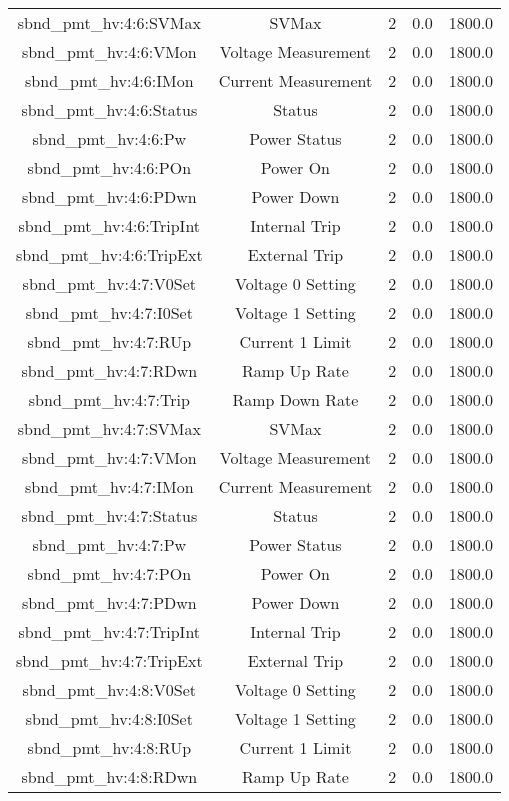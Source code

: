 \begin{table}[ptb]
\begin{tabular}{c | c c c c}
sbnd_pmt_hv:4:6:SVMax & SVMax & 2 & 0.0 & 1800.0\\ 
sbnd_pmt_hv:4:6:VMon & Voltage Measurement & 2 & 0.0 & 1800.0\\ 
sbnd_pmt_hv:4:6:IMon & Current Measurement & 2 & 0.0 & 1800.0\\ 
sbnd_pmt_hv:4:6:Status & Status & 2 & 0.0 & 1800.0\\ 
sbnd_pmt_hv:4:6:Pw & Power Status & 2 & 0.0 & 1800.0\\ 
sbnd_pmt_hv:4:6:POn & Power On & 2 & 0.0 & 1800.0\\ 
sbnd_pmt_hv:4:6:PDwn & Power Down & 2 & 0.0 & 1800.0\\ 
sbnd_pmt_hv:4:6:TripInt & Internal Trip & 2 & 0.0 & 1800.0\\ 
sbnd_pmt_hv:4:6:TripExt & External Trip & 2 & 0.0 & 1800.0\\ 
sbnd_pmt_hv:4:7:V0Set & Voltage 0 Setting & 2 & 0.0 & 1800.0\\ 
sbnd_pmt_hv:4:7:I0Set & Voltage 1 Setting & 2 & 0.0 & 1800.0\\ 
sbnd_pmt_hv:4:7:RUp & Current 1 Limit & 2 & 0.0 & 1800.0\\ 
sbnd_pmt_hv:4:7:RDwn & Ramp Up Rate & 2 & 0.0 & 1800.0\\ 
sbnd_pmt_hv:4:7:Trip & Ramp Down Rate & 2 & 0.0 & 1800.0\\ 
sbnd_pmt_hv:4:7:SVMax & SVMax & 2 & 0.0 & 1800.0\\ 
sbnd_pmt_hv:4:7:VMon & Voltage Measurement & 2 & 0.0 & 1800.0\\ 
sbnd_pmt_hv:4:7:IMon & Current Measurement & 2 & 0.0 & 1800.0\\ 
sbnd_pmt_hv:4:7:Status & Status & 2 & 0.0 & 1800.0\\ 
sbnd_pmt_hv:4:7:Pw & Power Status & 2 & 0.0 & 1800.0\\ 
sbnd_pmt_hv:4:7:POn & Power On & 2 & 0.0 & 1800.0\\ 
sbnd_pmt_hv:4:7:PDwn & Power Down & 2 & 0.0 & 1800.0\\ 
sbnd_pmt_hv:4:7:TripInt & Internal Trip & 2 & 0.0 & 1800.0\\ 
sbnd_pmt_hv:4:7:TripExt & External Trip & 2 & 0.0 & 1800.0\\ 
sbnd_pmt_hv:4:8:V0Set & Voltage 0 Setting & 2 & 0.0 & 1800.0\\ 
sbnd_pmt_hv:4:8:I0Set & Voltage 1 Setting & 2 & 0.0 & 1800.0\\ 
sbnd_pmt_hv:4:8:RUp & Current 1 Limit & 2 & 0.0 & 1800.0\\ 
sbnd_pmt_hv:4:8:RDwn & Ramp Up Rate & 2 & 0.0 & 1800.0\\ 

\end{tabular}
\end{table}
